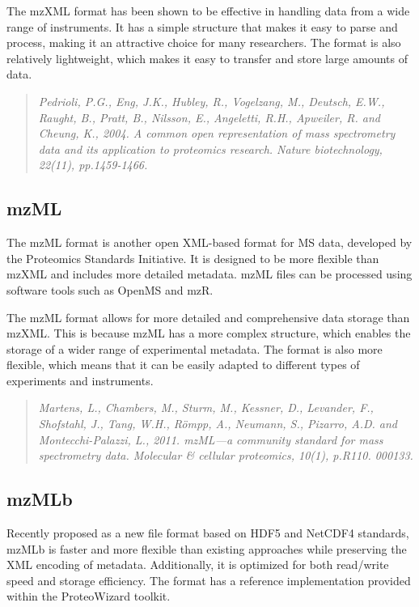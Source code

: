\documentclass[
]{book}
\begin{document}
The mzXML format has been shown to be effective in handling data from a wide range of instruments. It has a simple structure that makes it easy to parse and process, making it an attractive choice for many researchers. The format is also relatively lightweight, which makes it easy to transfer and store large amounts of data.

\begin{quote}
\emph{Pedrioli, P.G., Eng, J.K., Hubley, R., Vogelzang, M., Deutsch, E.W., Raught, B., Pratt, B., Nilsson, E., Angeletti, R.H., Apweiler, R. and Cheung, K., 2004. A common open representation of mass spectrometry data and its application to proteomics research. Nature biotechnology, 22(11), pp.1459-1466.}
\end{quote}

\hypertarget{mzml}{%
\subsection*{mzML}\label{mzml}}

The mzML format is another open XML-based format for MS data, developed by the Proteomics Standards Initiative. It is designed to be more flexible than mzXML and includes more detailed metadata. mzML files can be processed using software tools such as OpenMS and mzR.

The mzML format allows for more detailed and comprehensive data storage than mzXML. This is because mzML has a more complex structure, which enables the storage of a wider range of experimental metadata. The format is also more flexible, which means that it can be easily adapted to different types of experiments and instruments.

\begin{quote}
\emph{Martens, L., Chambers, M., Sturm, M., Kessner, D., Levander, F., Shofstahl, J., Tang, W.H., Römpp, A., Neumann, S., Pizarro, A.D. and Montecchi-Palazzi, L., 2011. mzML---a community standard for mass spectrometry data. Molecular \& cellular proteomics, 10(1), p.R110. 000133.}
\end{quote}

\hypertarget{mzmlb}{%
\subsection*{mzMLb}\label{mzmlb}}

Recently proposed as a new file format based on HDF5 and NetCDF4 standards, mzMLb is faster and more flexible than existing approaches while preserving the XML encoding of metadata. Additionally, it is optimized for both read/write speed and storage efficiency. The format has a reference implementation provided within the ProteoWizard toolkit.
\end{document}
